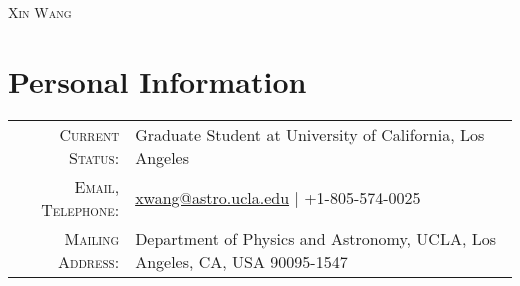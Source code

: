 \documentclass[letterpaper,11pt]{article}
\begin{document}
\par{\centering
  {\LARGE \textsc{Xin Wang}}
\par}

\section{Personal Information}
\begin{tabular}{rl}
    \textsc{Current Status:}  & Graduate Student at University of California, Los Angeles \\
    \textsc{Email, Telephone:}  & \href{mailto:xwang@astro.ucla.edu}{xwang@astro.ucla.edu}  |  +1-805-574-0025 \\
    \textsc{Mailing Address:} & Department of Physics and Astronomy, UCLA, Los Angeles, CA, USA 90095-1547
\end{tabular}


\end{document}
